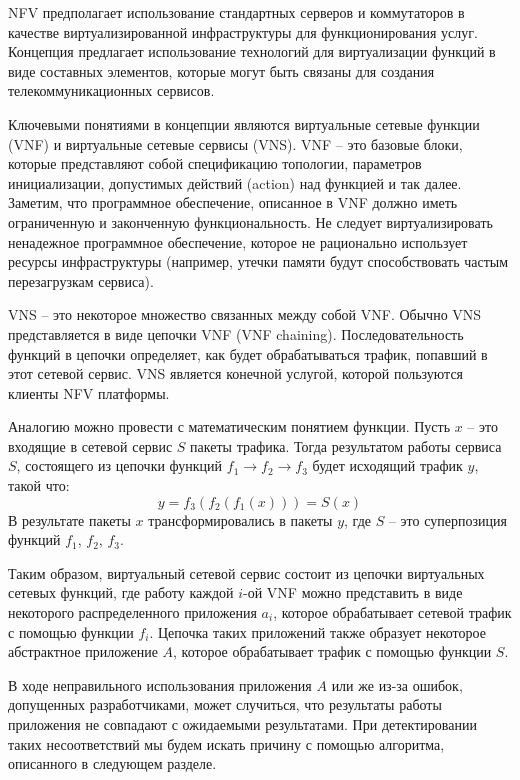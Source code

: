 \documentclass[oneside,final,14pt,a4paper]{extreport}
\begin{document}
NFV предполагает использование стандартных серверов и коммутаторов в качестве виртуализированной инфраструктуры для функционирования услуг. Концепция предлагает использование технологий для виртуализации функций в виде составных элементов, которые могут быть связаны для создания телекоммуникационных сервисов.

Ключевыми понятиями в концепции являются виртуальные сетевые функции (VNF) и виртуальные сетевые сервисы (VNS). VNF -- это базовые блоки, которые представляют собой спецификацию топологии, параметров инициализации, допустимых действий (action) над функцией и так далее. Заметим, что программное обеспечение, описанное в VNF должно иметь ограниченную и законченную функциональность. Не следует виртуализировать ненадежное программное обеспечение, которое не рационально использует ресурсы инфраструктуры (например, утечки памяти будут способствовать частым перезагрузкам сервиса). 

VNS -- это некоторое множество связанных между собой VNF. Обычно VNS представляется в виде цепочки VNF (VNF chaining). Последовательность функций в цепочки определяет, как будет обрабатываться трафик, попавший в этот сетевой сервис. VNS является конечной услугой, которой пользуются клиенты NFV платформы. 

Аналогию можно провести с математическим понятием функции. Пусть $x$ -- это входящие в сетевой сервис $S$ пакеты трафика. Тогда результатом работы сервиса $S$, состоящего из цепочки функций $f_{1} \to f_{2} \to f_{3}$ будет исходящий трафик $y$, такой что:
\begin{equation}
	\label{eq:service_example}
	y = f_3(f_2(f_1(x))) = S(x)
\end{equation}
В результате пакеты $x$ трансформировались в пакеты $y$, где $S$ -- это суперпозиция функций $f_{1}$, $f_{2}$, $f_{3}$. 

Таким образом, виртуальный сетевой сервис состоит из цепочки виртуальных сетевых функций, где работу каждой $i$-ой VNF можно представить в виде некоторого распределенного приложения $a_{i}$, которое обрабатывает сетевой трафик с помощью функции $f_{i}$. Цепочка таких приложений также образует некоторое абстрактное приложение $A$, которое обрабатывает трафик с помощью функции $S$. 

В ходе неправильного использования приложения $A$ или же из-за ошибок, допущенных разработчиками, может случиться, что результаты работы приложения не совпадают с ожидаемыми результатами. При детектировании таких несоответствий мы будем искать причину с помощью  алгоритма, описанного в следующем разделе.
\end{document}
